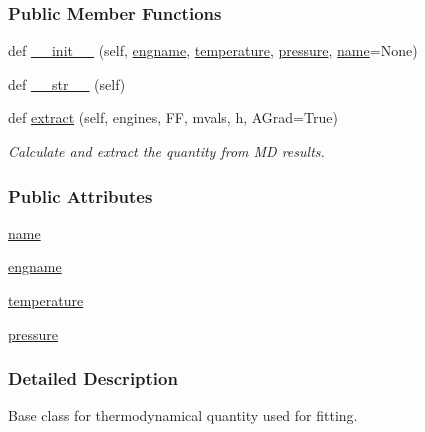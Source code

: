 \subsubsection*{Public Member Functions}
\begin{DoxyCompactItemize}
\item 
def \hyperlink{classsrc_1_1quantity_1_1Quantity_a47b1d34c21e799aeeebc184ccb40f0c9}{\+\_\+\+\_\+init\+\_\+\+\_\+} (self, \hyperlink{classsrc_1_1quantity_1_1Quantity_a75c5d4731a158b9f1daade94193e4105}{engname}, \hyperlink{classsrc_1_1quantity_1_1Quantity_a1f54d5969bb33f67e72bc9ff8c7d6b68}{temperature}, \hyperlink{classsrc_1_1quantity_1_1Quantity_adf325119dc5139a5d664707336bc2e65}{pressure}, \hyperlink{classsrc_1_1quantity_1_1Quantity_a88012f3c2a7b2adf06632d6910f21e83}{name}=None)
\item 
def \hyperlink{classsrc_1_1quantity_1_1Quantity_a75f05aea06603e7830b17c4fb4f5264f}{\+\_\+\+\_\+str\+\_\+\+\_\+} (self)
\item 
def \hyperlink{classsrc_1_1quantity_1_1Quantity_a31f14fa77a8312030e07f3be4b797dec}{extract} (self, engines, FF, mvals, h, A\+Grad=True)
\begin{DoxyCompactList}\small\item\em Calculate and extract the quantity from MD results. \end{DoxyCompactList}\end{DoxyCompactItemize}
\subsubsection*{Public Attributes}
\begin{DoxyCompactItemize}
\item 
\hyperlink{classsrc_1_1quantity_1_1Quantity_a88012f3c2a7b2adf06632d6910f21e83}{name}
\item 
\hyperlink{classsrc_1_1quantity_1_1Quantity_a75c5d4731a158b9f1daade94193e4105}{engname}
\item 
\hyperlink{classsrc_1_1quantity_1_1Quantity_a1f54d5969bb33f67e72bc9ff8c7d6b68}{temperature}
\item 
\hyperlink{classsrc_1_1quantity_1_1Quantity_adf325119dc5139a5d664707336bc2e65}{pressure}
\end{DoxyCompactItemize}


\subsubsection{Detailed Description}
Base class for thermodynamical quantity used for fitting. 

